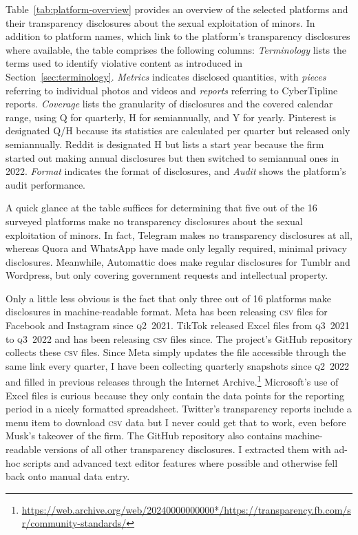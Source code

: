 \documentclass[nonacm,screen]{acmart}
\newcommand\V[1]{\textsc{\MakeLowercase{#1}}}
\begin{document}
Table~\ref{tab:platform-overview} provides an overview of the selected platforms
and their transparency disclosures about the sexual exploitation of minors. In
addition to platform names, which link to the platform's transparency
disclosures where available, the table comprises the following columns:
\emph{Terminology} lists the terms used to identify violative content as
introduced in Section~\ref{sec:terminology}. \emph{Metrics} indicates disclosed
quantities, with \emph{pieces} referring to individual photos and videos and
\emph{reports} referring to CyberTipline reports. \emph{Coverage} lists the
granularity of disclosures and the covered calendar range, using Q for
quarterly, H for semiannually, and Y for yearly. Pinterest is designated Q/H
because its statistics are calculated per quarter but released only
semiannually. Reddit is designated H but lists a start year because the firm
started out making annual disclosures but then switched to semiannual ones in
2022. \emph{Format} indicates the format of disclosures, and \emph{Audit} shows
the platform's audit performance.

A quick glance at the table suffices for determining that five out of the 16
surveyed platforms make no transparency disclosures about the sexual
exploitation of minors. In fact, Telegram makes no transparency disclosures at
all, whereas Quora and WhatsApp have made only legally required, minimal privacy
disclosures. Meanwhile, Automattic does make regular disclosures for Tumblr and
Wordpress, but only covering government requests and intellectual property.

Only a little less obvious is the fact that only three out of 16 platforms make
disclosures in machine-readable format. Meta has been releasing \V{CSV} files
for Facebook and Instagram since \V{Q2}~2021. TikTok released Excel files from
\V{Q3}~2021 to \V{Q3}~2022 and has been releasing \V{CSV} files since. The
project's GitHub repository collects these \V{CSV} files. Since Meta simply
updates the file accessible through the same link every quarter, I have been
collecting quarterly snapshots since \V{Q2}~2022 and filled in previous releases
through the Internet
Archive.\footnote{\url{https://web.archive.org/web/20240000000000*/https://transparency.fb.com/sr/community-standards/}}
Microsoft's use of Excel files is curious because they only contain the data
points for the reporting period in a nicely formatted spreadsheet. Twitter's
transparency reports include a menu item to download \V{CSV} data but I never
could get that to work, even before Musk's takeover of the firm. The GitHub
repository also contains machine-readable versions of all other transparency
disclosures. I extracted them with ad-hoc scripts and advanced text editor
features where possible and otherwise fell back onto manual data entry.
\end{document}
